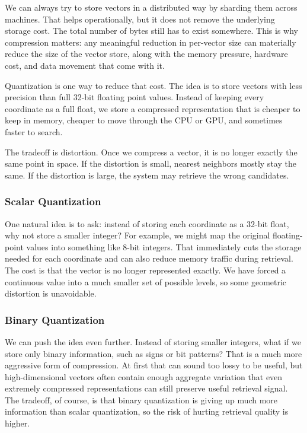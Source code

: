 \documentclass[12pt]{article}
\begin{document}
We can always try to store vectors in a distributed way by sharding them
across machines. That helps operationally, but it does not remove the
underlying storage cost. The total number of bytes still has to exist
somewhere. This is why compression matters: any meaningful reduction in
per-vector size can materially reduce the size of the vector store, along
with the memory pressure, hardware cost, and data movement that come with
it.

Quantization is one way to reduce that cost. The idea is to store vectors
with less precision than full 32-bit floating point values. Instead of
keeping every coordinate as a full float, we store a compressed
representation that is cheaper to keep in memory, cheaper to move through
the CPU or GPU, and sometimes faster to search.

The tradeoff is distortion. Once we compress a vector, it is no longer
exactly the same point in space. If the distortion is small, nearest
neighbors mostly stay the same. If the distortion is large, the system may
retrieve the wrong candidates.

\subsubsection{Scalar Quantization}

One natural idea is to ask: instead of storing each coordinate as a
32-bit float, why not store a smaller integer? For example, we might map
the original floating-point values into something like 8-bit integers.
That immediately cuts the storage needed for each coordinate and can also
reduce memory traffic during retrieval. The cost is that the vector is no
longer represented exactly. We have forced a continuous value into a much
smaller set of possible levels, so some geometric distortion is
unavoidable.

\subsubsection{Binary Quantization}

We can push the idea even further. Instead of storing smaller integers,
what if we store only binary information, such as signs or bit patterns?
That is a much more aggressive form of compression. At first that can
sound too lossy to be useful, but high-dimensional vectors often contain
enough aggregate variation that even extremely compressed
representations can still preserve useful retrieval signal. The tradeoff,
of course, is that binary quantization is giving up much more information
than scalar quantization, so the risk of hurting retrieval quality is
higher.
\end{document}
